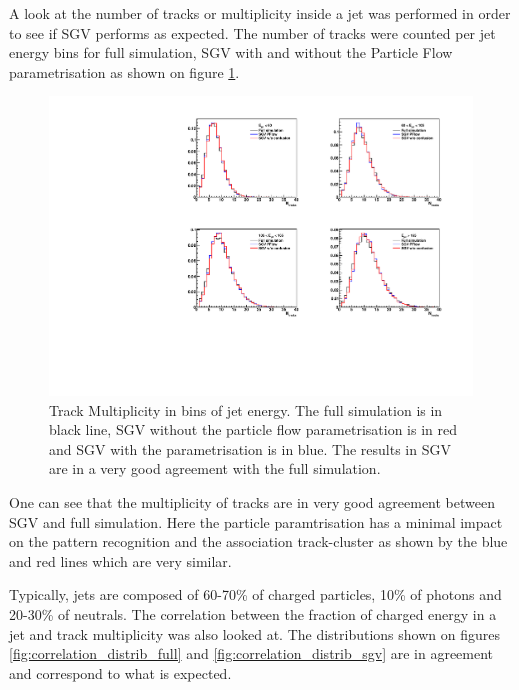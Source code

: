 A look at the number of tracks or multiplicity inside a jet was performed in order to see if SGV performs as expected. The number of tracks were counted per jet energy bins for full simulation, SGV with and without the Particle Flow parametrisation as shown on figure \ref{fig:trk_multiplicity}.

\begin{figure}[t]
  \centering
  \includegraphics[width=1\linewidth]{chap6/fig_SGV/multiplicity_jet_track.pdf}
  \caption{Track Multiplicity in bins of jet energy. The full simulation is in black line, SGV without the particle flow parametrisation is in red and SGV with the parametrisation is in blue. The results in SGV are in a very good agreement with the full simulation.}
  \label{fig:trk_multiplicity}
\end{figure}

One can see that the multiplicity of tracks are in very good agreement between SGV and full simulation. Here the particle paramtrisation has a minimal impact on the pattern recognition and the association track-cluster as shown by the blue and red lines which are very similar.

Typically, jets are composed of 60-70\% of charged particles, 10\% of photons and 20-30\% of neutrals. The correlation between the fraction of charged energy in a jet and track multiplicity was also looked at. The distributions shown on figures \ref{fig:correlation_distrib_full} and \ref{fig:correlation_distrib_sgv} are in agreement and correspond to what is expected.

